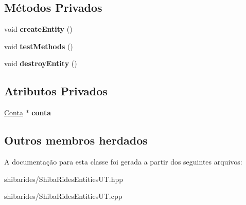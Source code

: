\subsection*{Métodos Privados}
\begin{DoxyCompactItemize}
\item 
void {\bfseries create\+Entity} ()\hypertarget{classshibarides_1_1TUConta_a46245886d37c130c2b9e6b376769d649}{}\label{classshibarides_1_1TUConta_a46245886d37c130c2b9e6b376769d649}

\item 
void {\bfseries test\+Methods} ()\hypertarget{classshibarides_1_1TUConta_a14dfcdae5cf8c0c77476f6e947d1043c}{}\label{classshibarides_1_1TUConta_a14dfcdae5cf8c0c77476f6e947d1043c}

\item 
void {\bfseries destroy\+Entity} ()\hypertarget{classshibarides_1_1TUConta_adf20042c05b45a52c40cba582a27918c}{}\label{classshibarides_1_1TUConta_adf20042c05b45a52c40cba582a27918c}

\end{DoxyCompactItemize}
\subsection*{Atributos Privados}
\begin{DoxyCompactItemize}
\item 
\hyperlink{classshibarides_1_1Conta}{Conta} $\ast$ {\bfseries conta}\hypertarget{classshibarides_1_1TUConta_a9f6f3fce6eae9a97c60b1726f99daad6}{}\label{classshibarides_1_1TUConta_a9f6f3fce6eae9a97c60b1726f99daad6}

\end{DoxyCompactItemize}
\subsection*{Outros membros herdados}


A documentação para esta classe foi gerada a partir dos seguintes arquivos\+:\begin{DoxyCompactItemize}
\item 
shibarides/Shiba\+Rides\+Entities\+U\+T.\+hpp\item 
shibarides/Shiba\+Rides\+Entities\+U\+T.\+cpp\end{DoxyCompactItemize}
